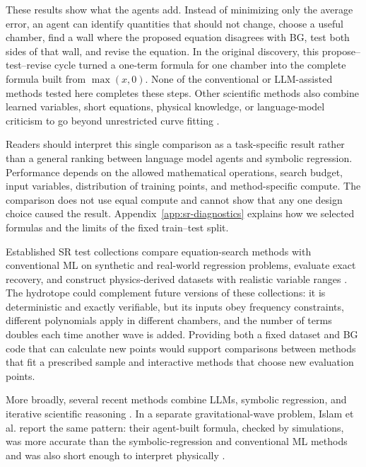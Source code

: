 \documentclass{article}
\begin{document}
These results show what the agents add. Instead of minimizing only the average
error, an agent can identify quantities that should not change, choose a
useful chamber, find a wall where the proposed equation disagrees with BG,
test both sides of that wall, and revise the equation. In the original
discovery, this propose--test--revise cycle turned a one-term formula for one chamber
into the complete formula built from $\max(x,0)$. None of the conventional or
LLM-assisted methods tested here completes these steps. Other scientific
methods also combine learned variables, short equations, physical knowledge,
or language-model criticism to go beyond unrestricted curve fitting
\citep{Wu2018AIPhysicist,Champion2019Coordinates,Chen2021StateVariables,
Cornelio2021AIDescartes,Li2024AutomatedModelDiscovery}.

Readers should interpret this single comparison as a task-specific result
rather than a general ranking between language model agents and symbolic regression.
Performance depends on the allowed mathematical operations, search budget,
input variables, distribution of training points, and method-specific compute.
The comparison does not use equal compute and cannot show that any one design
choice caused the result. Appendix~\ref{app:sr-diagnostics} explains how we
selected formulas and the limits of the fixed train--test split.

Established SR test collections compare equation-search methods with conventional
ML on synthetic and real-world regression problems, evaluate exact recovery,
and construct physics-derived datasets with realistic variable ranges
\citep{Orzechowski2018Benchmark,LaCava2021SRBench,Matsubara2022Rethinking}.
The hydrotope could complement future versions of these collections: it
is deterministic and exactly verifiable, but its inputs obey frequency
constraints, different polynomials apply in different chambers, and the number of
terms doubles each time another wave is added. Providing both a
fixed dataset and BG code that can calculate new points would support
comparisons between methods that fit a prescribed sample and interactive
methods that choose new evaluation points.

More broadly, several recent methods combine LLMs, symbolic regression, and
iterative scientific reasoning
\citep{Yang2026ThinkLA,su2026strideselfreflectiveagentframework,xia2025sr,
wang2025drsr,guo2025sr,pang2026deliberateevolutionagenticreasoning,N_gele_2026}.
In a separate gravitational-wave problem, Islam et al. report the same
pattern: their agent-built formula, checked by simulations, was
more accurate than the symbolic-regression and conventional ML methods and was
also short enough to interpret physically
\citep{Islam2026InterpretableSurrogates}.
\end{document}
